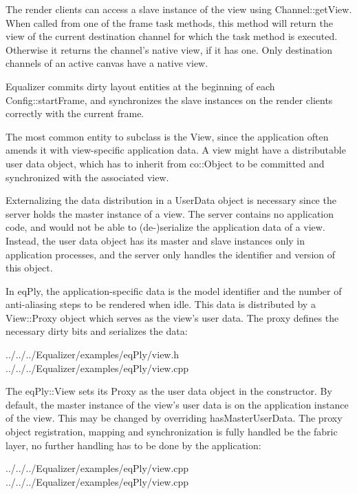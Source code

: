 \documentclass[10pt,a4]{scrartcl}
\begin{document}
The render clients can access a slave instance of the view using
\textsf{Channel::getView}. When called from one of the frame task
methods, this method will return the view of the current destination
channel for which the task method is executed. Otherwise it returns the
channel's native view, if it has one. Only destination channels of an
active canvas have a native view.

Equalizer commits dirty layout entities at the beginning of each
\textsf{Config::startFrame}, and synchronizes the slave instances on the
render clients correctly with the current frame.

The most common entity to subclass is the \textsf{View}, since the application
often amends it with view-specific application data. A view might have a
distributable user data object, which has to inherit from \textsf{co::Object} to
be committed and synchronized with the associated view.

Externalizing the data distribution in a \textsf{UserData} object is necessary
since the server holds the master instance of a view. The server contains no
application code, and would not be able to (de-)serialize the application data
of a view. Instead, the user data object has its master and slave instances only
in application processes, and the server only handles the identifier and version
of this object.

In \textsf{eqPly}, the application-specific data is the model identifier and the
number of anti-aliasing steps to be rendered when idle. This data is distributed
by a \textsf{View::Proxy} object which serves as the view's user data. The proxy
defines the necessary dirty bits and serializes the data:

{\footnotesize
  {../../../Equalizer/examples/eqPly/view.h}}
{\footnotesize
  {../../../Equalizer/examples/eqPly/view.cpp}}

The \textsf{eqPly::View} sets its \textsf{Proxy} as the user data object in the
constructor. By default, the master instance of the view's user data is on the
application instance of the view. This may be changed by overriding
\textsf{hasMasterUserData}. The proxy object registration, mapping and
synchronization is fully handled be the \textsf{fabric} layer, no further
handling has to be done by the application:

{\footnotesize
  {../../../Equalizer/examples/eqPly/view.cpp}}
{\footnotesize
  {../../../Equalizer/examples/eqPly/view.cpp}}
\end{document}
